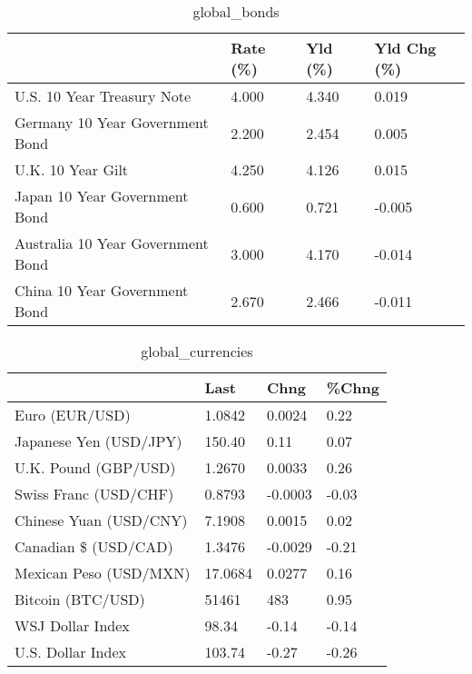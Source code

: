 \documentclass{article}%
\begin{document}
%


\begin{table}[htbp]%
\caption{global\_bonds}%
\centering%
\begin{adjustbox}{width=1\textwidth}%
\begin{tabular}{llll}
\toprule
                                  & Rate (\%) & Yld (\%) & Yld Chg (\%) \\
\midrule
       U.S. 10 Year Treasury Note &    4.000 &   4.340 &       0.019 \\
  Germany 10 Year Government Bond &    2.200 &   2.454 &       0.005 \\
                U.K. 10 Year Gilt &    4.250 &   4.126 &       0.015 \\
    Japan 10 Year Government Bond &    0.600 &   0.721 &      -0.005 \\
Australia 10 Year Government Bond &    3.000 &   4.170 &      -0.014 \\
    China 10 Year Government Bond &    2.670 &   2.466 &      -0.011 \\
\bottomrule
\end{tabular}
%
\end{adjustbox}%
\end{table}

%


\begin{table}[htbp]%
\caption{global\_currencies}%
\centering%
\begin{adjustbox}{width=1\textwidth}%
\begin{tabular}{llll}
\toprule
                       &    Last &    Chng & \%Chng \\
\midrule
        Euro (EUR/USD) &  1.0842 &  0.0024 &  0.22 \\
Japanese Yen (USD/JPY) &  150.40 &    0.11 &  0.07 \\
  U.K. Pound (GBP/USD) &  1.2670 &  0.0033 &  0.26 \\
 Swiss Franc (USD/CHF) &  0.8793 & -0.0003 & -0.03 \\
Chinese Yuan (USD/CNY) &  7.1908 &  0.0015 &  0.02 \\
  Canadian \$ (USD/CAD) &  1.3476 & -0.0029 & -0.21 \\
Mexican Peso (USD/MXN) & 17.0684 &  0.0277 &  0.16 \\
     Bitcoin (BTC/USD) &   51461 &     483 &  0.95 \\
      WSJ Dollar Index &   98.34 &   -0.14 & -0.14 \\
     U.S. Dollar Index &  103.74 &   -0.27 & -0.26 \\
\bottomrule
\end{tabular}
%
\end{adjustbox}%
\end{table}
\end{document}
